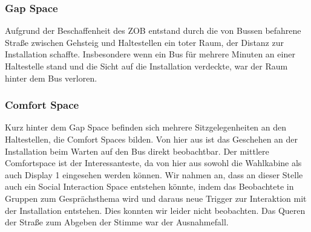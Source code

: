 \subsubsection{Gap Space}\label{gap-space}

Aufgrund der Beschaffenheit des ZOB entstand durch die von Bussen befahrene Straße zwischen Gehsteig und Haltestellen ein toter Raum, der Distanz zur Installation schaffte.
Insbesondere wenn ein Bus für mehrere Minuten an einer Haltestelle stand und die Sicht auf die Installation verdeckte, war der Raum hinter dem Bus verloren.

\subsubsection{Comfort Space}\label{comfort-space}

Kurz hinter dem Gap Space befinden sich mehrere Sitzgelegenheiten an den Haltestellen, die Comfort Spaces bilden.
Von hier aus ist das Geschehen an der Installation beim Warten auf den Bus direkt beobachtbar.
Der mittlere Comfortspace ist der Interessanteste, da von hier aus sowohl die Wahlkabine als auch Display 1 eingesehen werden können.
Wir nahmen an, dass an dieser Stelle auch ein Social Interaction Space entstehen könnte, indem das Beobachtete in Gruppen zum Gesprächsthema wird und daraus neue Trigger zur Interaktion mit der Installation entstehen.
Dies konnten wir leider nicht beobachten.
Das Queren der Straße zum Abgeben der Stimme war der Ausnahmefall.